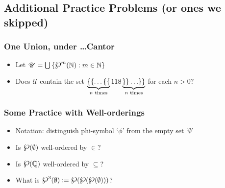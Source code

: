 \subsection{Additional Practice Problems (or ones we skipped)}


\begin{frame}
\frametitle{One Union, under \dots Cantor}

\begin{itemize}[<+->]

\item Let $\mathscr{U} = \bigcup \set{\powerset^m(\mathbb{N}): m \in \mathbb{N}}$

\item Does  $\mathscr{U}$ contain the set $\underbrace{\{\{\ldots\{\{}_{\mbox{\scriptsize $n$ times}}118\underbrace{\}\}\ldots\}\}}_{\mbox{\scriptsize $n$ times}}$ for each $n>0$? 



\end{itemize}
\end{frame}

\begin{frame}
\frametitle{Some Practice with Well-orderings}

\begin{itemize}[<+->]

\item Notation: distinguish phi-symbol `$\phi$' from the empty set `$\emptyset$'

\item Is $\powerset(\emptyset)$ well-ordered by $\in$?

\item Is $\powerset(\mathbb{Q})$  well-ordered by $\subseteq$?

\item What is $\powerset^3(\emptyset) := \powerset (\powerset (\powerset (\emptyset))) $? 

\end{itemize}
\end{frame}

